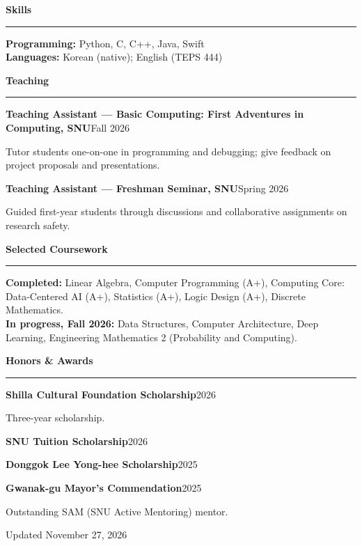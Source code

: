 \documentclass[10pt,a4paper]{article}
\newcommand{\cvsection}[1]{\par\addvspace{7pt}\Needspace{5\baselineskip}
  {\large\bfseries #1}\par\vspace{2pt}\hrule\vspace{5pt}}
\newcommand{\entry}[2]{\par\noindent\textbf{#1}\hfill{\small\color{muted}#2}\par}
\begin{document}
\cvsection{Skills}
\textbf{Programming:} Python, C, C++, Java, Swift\\
\textbf{Languages:} Korean (native); English (TEPS 444)

\cvsection{Teaching}
\entry{Teaching Assistant \textnormal{--- Basic Computing: First Adventures in Computing, SNU}}{Fall 2026}
Tutor students one-on-one in programming and debugging; give feedback on project proposals and presentations.
\vspace{5pt}
\entry{Teaching Assistant \textnormal{--- Freshman Seminar, SNU}}{Spring 2026}
Guided first-year students through discussions and collaborative assignments on research safety.

\cvsection{Selected Coursework}
\textbf{Completed:} Linear Algebra, Computer Programming (A+), Computing Core: Data-Centered AI (A+), Statistics (A+), Logic Design (A+), Discrete Mathematics.\\
\textbf{In progress, Fall 2026:} Data Structures, Computer Architecture, Deep Learning, Engineering Mathematics 2 (Probability and Computing).

\cvsection{Honors \& Awards}
\entry{Shilla Cultural Foundation Scholarship}{2026}
Three-year scholarship.
\entry{SNU Tuition Scholarship}{2026}
\entry{Donggok Lee Yong-hee Scholarship}{2025}
\entry{Gwanak-gu Mayor's Commendation}{2025}
Outstanding SAM (SNU Active Mentoring) mentor.

\vfill
{\scriptsize\color{muted}Updated November 27, 2026}
\end{document}
